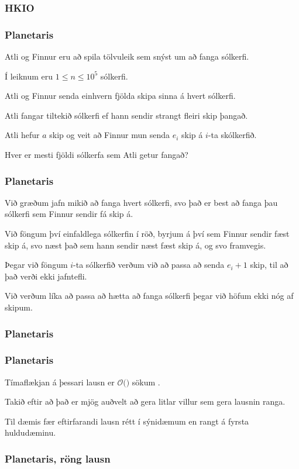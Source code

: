 {
	\frametitle{HKIO}
}

{
	\frametitle{Planetaris}
	{
		\item<1-> Atli og Finnur eru að spila tölvuleik sem snýst um að fanga sólkerfi.
		\item<2-> Í leiknum eru $1 \leq n \leq 10^5$ sólkerfi.
		\item<3-> Atli og Finnur senda einhvern fjölda skipa sinna á hvert sólkerfi.
		\item<4-> Atli fangar tiltekið sólkerfi ef hann sendir strangt fleiri skip þangað.
		\item<5-> Atli hefur $a$ skip og veit að Finnur mun senda $e_i$ skip á $i$-ta skólkerfið.
		\item<6-> Hver er mesti fjöldi sólkerfa sem Atli getur fangað?
	}
}

{
	\frametitle{Planetaris}
	{
		\item<1-> Við græðum jafn mikið að fanga hvert sólkerfi, svo það er best að fanga þau sólkerfi sem Finnur sendir fá skip á.
		\item<2-> Við föngum því einfaldlega sólkerfin í röð, byrjum á því sem Finnur sendir fæst skip á,
					svo næst það sem hann sendir næst fæst skip á, og svo framvegis.
		\item<3-> Þegar við föngum $i$-ta sólkerfið verðum við að passa að senda $e_i + 1$ skip, til að það verði ekki jafntefli.
		\item<4-> Við verðum líka að passa að hætta að fanga sólkerfi þegar við höfum ekki nóg af skipum.
	}
}

{
	\frametitle{Planetaris}
}

{
	\frametitle{Planetaris}
	{
		\item<1-> Tímaflækjan á þessari lausn er $\mathcal{O}($$)$ sökum \onslide<2->{röðunar}.
		\item<3-> Takið eftir að það er mjög auðvelt að gera litlar villur sem gera lausnin ranga.
		\item<4-> Til dæmis fær eftirfarandi lausn rétt í sýnidæmum en rangt á fyrsta huldudæminu.
	}
}

{
	\frametitle{Planetaris, röng lausn}
}

{
}


